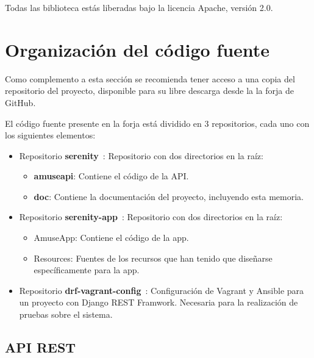 Todas las biblioteca estás liberadas bajo la licencia Apache, versión 2.0.

\section{Organización del código fuente}

Como complemento a esta sección se recomienda tener acceso a una copia del
repositorio del proyecto, disponible para su libre descarga desde la
la forja de GitHub.

El código fuente presente en la forja está dividido en 3 repositorios, cada uno
con los siguientes elementos:
\begin{itemize}
\item Repositorio \textbf{serenity}~\cite{repo-serenity}: Repositorio con dos
  directorios en la raíz:
  \begin{itemize}
  \item \textbf{amuseapi}: Contiene el código de la API.
  \item \textbf{doc}: Contiene la documentación del proyecto, incluyendo esta
    memoria.
  \end{itemize}
\item Repositorio \textbf{serenity-app}~\cite{repo-serenity-app}: Repositorio con
  dos directorios en la raíz:
  \begin{itemize}
  \item AmuseApp: Contiene el código de la app.
  \item Resources: Fuentes de los recursos que han tenido que diseñarse
    específicamente para la app.
  \end{itemize}
\item Repositorio \textbf{drf-vagrant-config}~\cite{repo-serenity}: Configuración
  de Vagrant y Ansible para un proyecto con Django REST Framwork. Necesaria para
  la realización de pruebas sobre el sistema.
\end{itemize}


\subsection{API REST}

